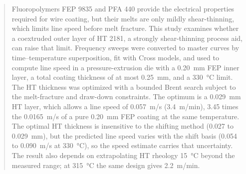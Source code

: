 \begin{abstract}
Fluoropolymers FEP 9835 and PFA 440 provide the electrical properties required for wire coating, but their melts are only mildly shear-thinning, which limits line speed before melt fracture. This study examines whether a coextruded outer layer of HT 2181, a strongly shear-thinning process aid, can raise that limit. Frequency sweeps were converted to master curves by time--temperature superposition, fit with Cross models, and used to compute line speed in a pressure-extrusion die with a 0.20~mm FEP inner layer, a total coating thickness of at most 0.25~mm, and a 330~°C limit. The HT thickness was optimized with a bounded Brent search subject to the melt-fracture and draw-down constraints. The optimum is a 0.029~mm HT layer, which allows a line speed of 0.057~m/s (3.4~m/min), 3.45 times the 0.0165~m/s of a pure 0.20~mm FEP coating at the same temperature. The optimal HT thickness is insensitive to the shifting method (0.027 to 0.029~mm), but the predicted line speed varies with the shift basis (0.054 to 0.090~m/s at 330~°C), so the speed estimate carries that uncertainty. The result also depends on extrapolating HT rheology 15~°C beyond the measured range; at 315~°C the same design gives 2.2~m/min.
\end{abstract}

